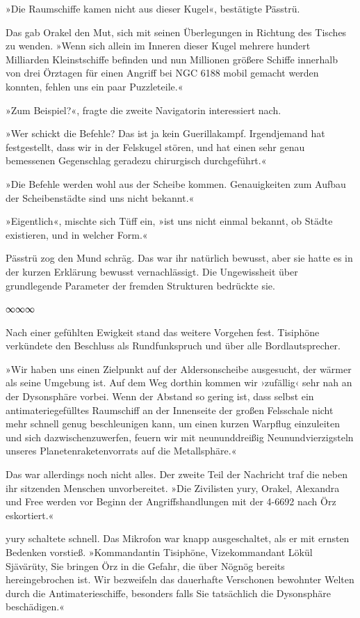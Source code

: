 »Die Raumschiffe kamen nicht aus dieser Kugel«, bestätigte Pässtrü.

Das gab Orakel den Mut, sich mit seinen Überlegungen in Richtung des Tisches zu wenden. »Wenn sich allein im Inneren dieser Kugel mehrere hundert Milliarden Kleinstschiffe befinden und nun Millionen größere Schiffe innerhalb von drei Örztagen für einen Angriff bei NGC 6188 mobil gemacht werden konnten, fehlen uns ein paar Puzzleteile.«

»Zum Beispiel?«, fragte die zweite Navigatorin interessiert nach.

»Wer schickt die Befehle? Das ist ja kein Guerillakampf. Irgendjemand hat festgestellt, dass wir in der Felskugel stören, und hat einen sehr genau bemessenen Gegenschlag geradezu chirurgisch durchgeführt.«

»Die Befehle werden wohl aus der Scheibe kommen. Genauigkeiten zum Aufbau der Scheibenstädte sind uns nicht bekannt.«

»Eigentlich«, mischte sich Tüff ein, »ist uns nicht einmal bekannt, ob Städte existieren, und in welcher Form.«

Pässtrü zog den Mund schräg. Das war ihr natürlich bewusst, aber sie hatte es in der kurzen Erklärung bewusst vernachlässigt. Die Ungewissheit über grundlegende Parameter der fremden Strukturen bedrückte sie.

\begin{center}
∞∞∞
\end{center}

Nach einer gefühlten Ewigkeit stand das weitere Vorgehen fest. Tisiphöne verkündete den Beschluss als Rundfunkspruch und über alle Bordlautsprecher.

»Wir haben uns einen Zielpunkt auf der Aldersonscheibe ausgesucht, der wärmer als seine Umgebung ist. Auf dem Weg dorthin kommen wir ›zufällig‹ sehr nah an der Dysonsphäre vorbei. Wenn der Abstand so gering ist, dass selbst ein antimateriegefülltes Raumschiff an der Innenseite der großen Felsschale nicht mehr schnell genug beschleunigen kann, um einen kurzen Warpflug einzuleiten und sich dazwischenzuwerfen, feuern wir mit neununddreißig Neunundvierzigsteln unseres Planetenraketenvorrats auf die Metallsphäre.«

Das war allerdings noch nicht alles. Der zweite Teil der Nachricht traf die neben ihr sitzenden Menschen unvorbereitet. »Die Zivilisten yury, Orakel, Alexandra und Free werden vor Beginn der Angriffshandlungen mit der 4-6692 nach Örz eskortiert.«

yury schaltete schnell. Das Mikrofon war knapp ausgeschaltet, als er mit ernsten Bedenken vorstieß. »Kommandantin Tisiphöne, Vizekommandant Lökül Sjävärüty, Sie bringen Örz in die Gefahr, die über Nögnög bereits hereingebrochen ist. Wir bezweifeln das dauerhafte Verschonen bewohnter Welten durch die Antimaterieschiffe, besonders falls Sie tatsächlich die Dysonsphäre beschädigen.«

